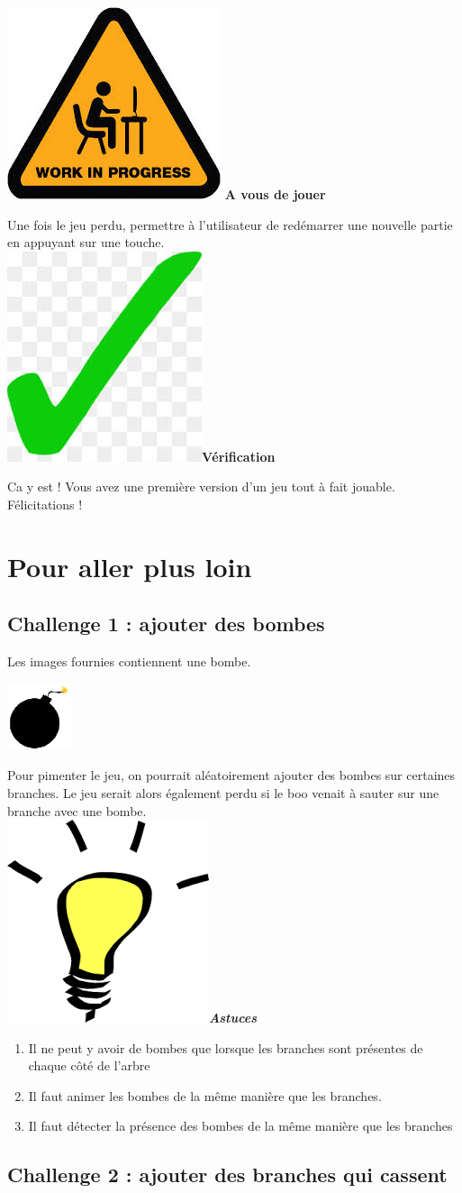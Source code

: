 \documentclass[french]{article}
\newcommand{\tips}{\includegraphics[scale=0.08]{tips}\textbf{\textit{Astuces\\}}}
\newcommand{\todo}{\includegraphics[scale=0.1]{work_in_progress}\textbf{ A vous de jouer\\} }
\newcommand{\result}{\includegraphics[scale=0.1]{green_tick}\textbf{Vérification\\}}
\begin{document}
\todo

Une fois le jeu perdu, permettre à l'utilisateur de redémarrer une nouvelle partie en appuyant sur une touche.\\

\result

Ca y est ! Vous avez une première version d'un jeu tout à fait jouable. Félicitations ! 

\section{Pour aller plus loin}

\subsection{Challenge 1 : ajouter des bombes}

Les images fournies contiennent une bombe. 

\begin{center}
	\includegraphics[scale=2]{bomb}
\end{center}

Pour pimenter le jeu, on pourrait aléatoirement ajouter des bombes sur certaines branches. Le jeu serait alors également perdu si le boo venait à sauter sur une branche avec une bombe.\\

\tips

\begin{enumerate}
	
	\item Il ne peut y avoir de bombes que lorsque les branches sont présentes de chaque côté de l'arbre\\
	
	\item Il faut animer les bombes de la même manière que les branches.\\
	
	\item Il faut détecter la présence des bombes de la même manière que les branches\\
	
\end{enumerate}	

\subsection{Challenge 2 : ajouter des branches qui cassent}
\end{document}
